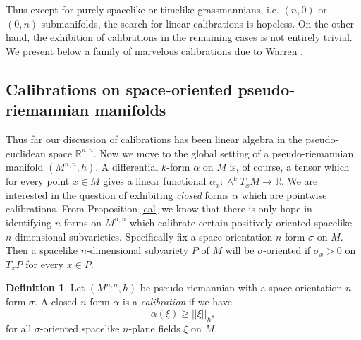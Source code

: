 \documentclass[12pt]{amsart}
\theoremstyle{definition}
\newtheorem{dfn}[thm]{Definition}
\newtheorem{exx}[thm]{Example}
\theoremstyle{remark}
\newcommand{\bR}{\mathbb{R}}
\begin{document}


Thus except for purely spacelike or timelike grassmannians, i.e. $(n,0)$ or $(0,n)$-submanifolds, the search for linear calibrations is hopeless. On the other hand, the exhibition of calibrations in the remaining cases is not entirely trivial. We present below a family of marvelous calibrations due to Warren \cite{W}. 



\subsection{Calibrations on space-oriented pseudo-riemannian manifolds}\label{cal2}
Thus far our discussion of calibrations has been linear algebra in the pseudo-euclidean space $\bR^{n,n}$. Now we move to the global setting of a pseudo-riemannian manifold $(M^{n,n},h)$. A differential $k$-form $\alpha$ on $M$ is, of course, a tensor which for every point $x\in M$ gives a linear functional $\alpha_x:\wedge^k T_xM \to \bR$. We are interested in the question of exhibiting \emph{closed} forms $\alpha$ which are pointwise calibrations. From Proposition \ref{cal} we know that there is only hope in identifying $n$-forms on $M^{n,n}$ which calibrate certain positively-oriented spacelike $n$-dimensional subvarieties. Specifically fix a space-orientation $n$-form $\sigma$ on $M$. Then a spacelike $n$-dimensional subvariety $P$ of $M$ will be $\sigma$-oriented if $\sigma_x>0$ on $T_x P$ for every $x\in P$.  

\begin{dfn} Let $(M^{n,n},h)$ be pseudo-riemannian with a space-orientation $n$-form $\sigma$. A closed $n$-form $\alpha$ is a \emph{calibration} if we have $$\alpha(\xi) \geq ||\xi||_h,$$ for all $\sigma$-oriented spacelike $n$-plane fields $\xi$ on $M$. 
\end{dfn}
\end{document}

